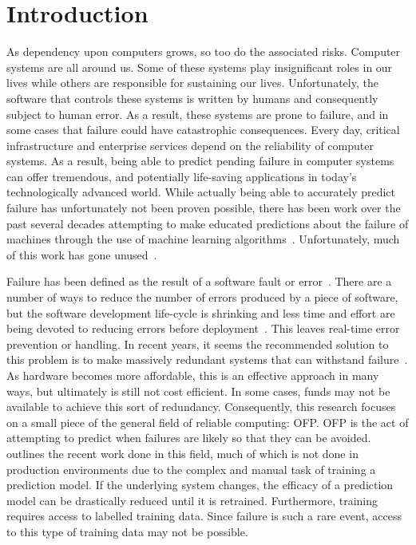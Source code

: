 \section{Introduction} \label{chapter1}
As dependency upon computers grows, so too do the associated risks.  Computer
systems are all around us.  Some of these systems play insignificant
roles in our lives while others are responsible for sustaining our lives.
Unfortunately, the software that controls these systems is written by humans
and consequently subject to human error.  As a result, these systems are prone
to failure, and in some cases that failure could have catastrophic
consequences.  Every day, critical infrastructure and enterprise services
depend on the reliability of computer systems.  As a result, being able to
predict pending failure in computer systems can offer tremendous, and
potentially life-saving applications in today's technologically advanced world.
While actually being able to accurately predict failure has unfortunately not
been proven possible, there has been work over the past several decades
attempting to make educated predictions about the failure of machines through
the use of machine learning algorithms~\citep{salfnerSurvey}.  Unfortunately,
much of this work has gone unused~\citep{irrera2015}.  

Failure has been defined as the result of a software fault or
error~\citep{salfnerSurvey}.  There are a number of ways to reduce the number of
errors produced by a piece of software, but the software development life-cycle
is shrinking and less time and effort are being devoted to reducing errors
before deployment~\citep{schmidt2016}.  This leaves real-time error prevention
or handling.  In recent years, it seems the recommended solution to this
problem is to make massively redundant systems that can withstand
failure~\citep{bauer2012}.  As hardware becomes more affordable, this is an
effective approach in many ways, but ultimately is still not cost efficient.
In some cases, funds may not be available to achieve this sort of redundancy.
Consequently, this research focuses on a small piece of the general field of
reliable computing: \ac{OFP}.  \ac{OFP} is the act of attempting to predict
when failures are likely so that they can be avoided.  \citet{salfnerSurvey}
outlines the recent work done in this field, much of which is not done in
production environments due to the complex and manual task of training a
prediction model.  If the underlying system changes, the efficacy of a
prediction model can be drastically reduced until it is retrained.
Furthermore, training requires access to labelled training data.  Since failure
is such a rare event, access to this type of training data may not be possible.  

